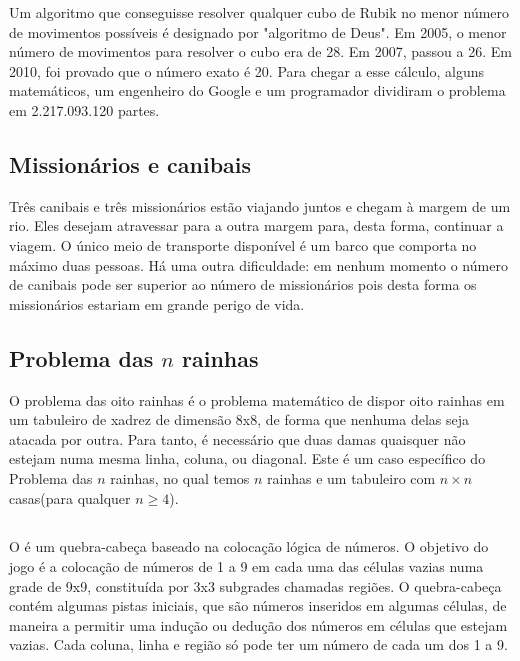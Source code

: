 \documentclass[a4paper,11pt]{karticle}
\begin{document}
Um algoritmo que conseguisse resolver qualquer cubo de Rubik no menor número de movimentos possíveis é designado por "algoritmo de Deus". Em 2005, o menor número de movimentos para resolver o cubo era de 28. Em 2007, passou a 26. Em 2010, foi provado que o número exato é 20. Para chegar a esse cálculo, alguns matemáticos, um engenheiro do Google e um programador dividiram o problema em 2.217.093.120 partes. 

\subsection*{Missionários e canibais}

Três canibais e três missionários estão viajando juntos e chegam à margem de um rio. Eles desejam atravessar para a outra margem para, desta forma, continuar a viagem. O único meio de transporte disponível é um barco que comporta no máximo duas pessoas. Há uma outra dificuldade: em nenhum momento o número de canibais pode ser superior ao número de missionários pois desta forma os missionários estariam em grande perigo de vida. 

\subsection*{Problema das $n$ rainhas}

O problema das oito rainhas é o problema matemático de dispor oito rainhas em um tabuleiro de xadrez de dimensão 8x8, de forma que nenhuma delas seja atacada por outra. Para tanto, é necessário que duas damas quaisquer não estejam numa mesma linha, coluna, ou diagonal. Este é um caso específico do Problema das $n$ rainhas, no qual temos $n$ rainhas e um tabuleiro com $n \times n$ casas(para qualquer $n \ge 4$).

\subsection*{}

O  é um quebra-cabeça baseado na colocação lógica de números. O objetivo do jogo é a colocação de números de 1 a 9 em cada uma das células vazias numa grade de 9x9, constituída por 3x3 subgrades chamadas regiões. O quebra-cabeça contém algumas pistas iniciais, que são números inseridos em algumas células, de maneira a permitir uma indução ou dedução dos números em células que estejam vazias. Cada coluna, linha e região só pode ter um número de cada um dos 1 a 9. 
\end{document}

